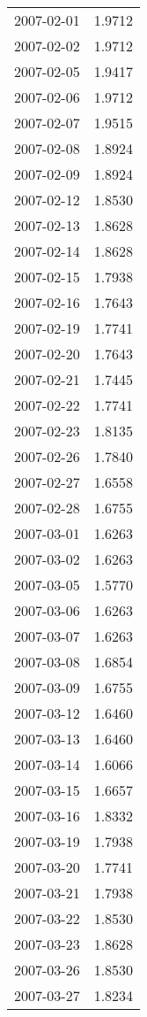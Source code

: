 \begin{tabular}{lr}
2007-02-01 &      1.9712 \\
2007-02-02 &      1.9712 \\
2007-02-05 &      1.9417 \\
2007-02-06 &      1.9712 \\
2007-02-07 &      1.9515 \\
2007-02-08 &      1.8924 \\
2007-02-09 &      1.8924 \\
2007-02-12 &      1.8530 \\
2007-02-13 &      1.8628 \\
2007-02-14 &      1.8628 \\
2007-02-15 &      1.7938 \\
2007-02-16 &      1.7643 \\
2007-02-19 &      1.7741 \\
2007-02-20 &      1.7643 \\
2007-02-21 &      1.7445 \\
2007-02-22 &      1.7741 \\
2007-02-23 &      1.8135 \\
2007-02-26 &      1.7840 \\
2007-02-27 &      1.6558 \\
2007-02-28 &      1.6755 \\
2007-03-01 &      1.6263 \\
2007-03-02 &      1.6263 \\
2007-03-05 &      1.5770 \\
2007-03-06 &      1.6263 \\
2007-03-07 &      1.6263 \\
2007-03-08 &      1.6854 \\
2007-03-09 &      1.6755 \\
2007-03-12 &      1.6460 \\
2007-03-13 &      1.6460 \\
2007-03-14 &      1.6066 \\
2007-03-15 &      1.6657 \\
2007-03-16 &      1.8332 \\
2007-03-19 &      1.7938 \\
2007-03-20 &      1.7741 \\
2007-03-21 &      1.7938 \\
2007-03-22 &      1.8530 \\
2007-03-23 &      1.8628 \\
2007-03-26 &      1.8530 \\
2007-03-27 &      1.8234 \\

\end{tabular}
